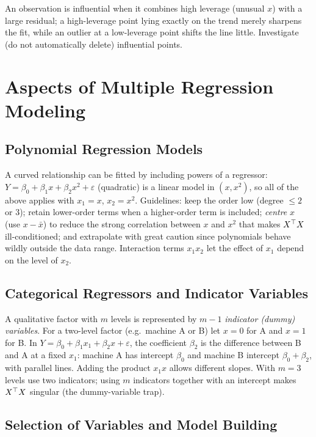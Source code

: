 An observation is influential when it combines high leverage (unusual $x$) with a large residual; a high-leverage point lying exactly on the trend merely sharpens the fit, while an outlier at a low-leverage point shifts the line little. Investigate (do not automatically delete) influential points.

\section{Aspects of Multiple Regression Modeling}

\subsection{Polynomial Regression Models}

A curved relationship can be fitted by including powers of a regressor: $Y=\beta_0+\beta_1x+\beta_2x^2+\varepsilon$ (quadratic) is a linear model in $(x,x^2)$, so all of the above applies with $x_1=x$, $x_2=x^2$. Guidelines: keep the order low (degree $\le2$ or $3$); retain lower-order terms when a higher-order term is included; \emph{centre} $x$ (use $x-\bar{x}$) to reduce the strong correlation between $x$ and $x^2$ that makes $X^{\top} X$ ill-conditioned; and extrapolate with great caution since polynomials behave wildly outside the data range. Interaction terms $x_1x_2$ let the effect of $x_1$ depend on the level of $x_2$.

\subsection{Categorical Regressors and Indicator Variables}

A qualitative factor with $m$ levels is represented by $m-1$ \emph{indicator (dummy) variables}. For a two-level factor (e.g.\ machine A or B) let $x=0$ for A and $x=1$ for B. In $Y=\beta_0+\beta_1x_1+\beta_2x+\varepsilon$, the coefficient $\beta_2$ is the difference between B and A at a fixed $x_1$: machine A has intercept $\beta_0$ and machine B intercept $\beta_0+\beta_2$, with parallel lines. Adding the product $x_1x$ allows different slopes. With $m=3$ levels use two indicators; using $m$ indicators together with an intercept makes $X^{\top} X$ singular (the dummy-variable trap).

\subsection{Selection of Variables and Model Building}

